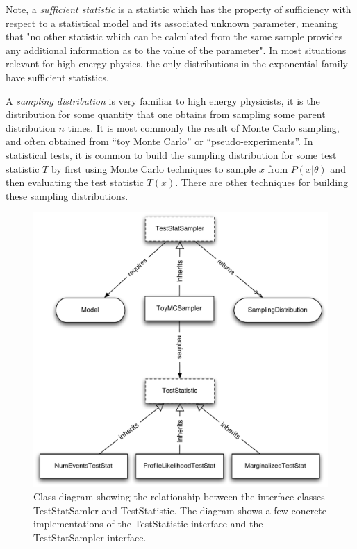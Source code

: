 \documentclass[11pt]{article}
\begin{document}
Note, a \textit{sufficient statistic} is a statistic which has the property of sufficiency with respect to a statistical model and its associated unknown parameter, meaning that "no other statistic which can be calculated from the same sample provides any additional information as to the value of the parameter".  In most situations relevant for high energy physics, the only distributions in the exponential family have sufficient statistics.

A \textit{sampling distribution} is very familiar to high energy physicists, it is the distribution for some quantity that one obtains from sampling some parent distribution $n$ times.  It is most commonly the result of Monte Carlo sampling, and often obtained from ``toy Monte Carlo'' or ``pseudo-experiments''.  In statistical tests, it is common to build the sampling distribution for some test statistic $T$ by first using Monte Carlo techniques to sample $x$ from $P(x|\theta)$ and then evaluating the test statistic $T(x)$.  There are other techniques for building these sampling distributions.



\begin{figure}[htbp]
\begin{center}
\includegraphics[width=\textwidth]{RooStats_TestStatistic.pdf}
\caption{Class diagram showing the relationship between the interface classes TestStatSamler and TestStatistic.  The diagram shows a few concrete implementations of the TestStatistic interface and the TestStatSampler interface.}
\label{fig:TestStatistic}
\end{center}
\end{figure}
\end{document}
